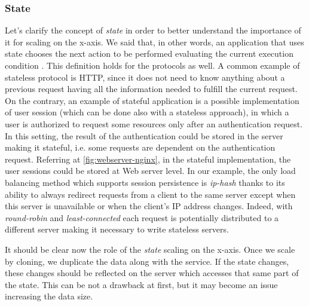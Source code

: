 \subsubsection{State}
Let's clarify the concept of \emph{state} in order to better understand the
importance of it for scaling on the x-axis. We said that, in other words, an
application that uses state chooses the next action to be performed evaluating
the current execution condition \cite{bib:art-of-scalability}. This definition
holds for the protocols as well. A common example of stateless protocol is HTTP,
since it does not need to know anything about a previous request having all the
information needed to fulfill the current request. On the contrary, an example
of stateful application is a possible implementation of user session (which can
be done also with a stateless approach), in which a user is authorized to
request some resources only after an authentication request. In this setting,
the result of the authentication could be stored in the server making it
stateful, i.e. some requests are dependent on the authentication request.
Referring at \autoref{fig:webserver-nginx}, in the stateful implementation, the
user sessions could be stored at Web server level. In our example, the only load
balancing method which supports session persistence is \emph{ip-hash} thanks to
its ability to always redirect requests from a client to the same server except
when this server is unavailable or when the client's IP address changes. Indeed,
with \emph{round-robin} and \emph{least-connected} each request is potentially
distributed to a different server making it necessary to write stateless
servers.

It should be clear now the role of the \emph{state} scaling on the x-axis. Once
we scale by cloning, we duplicate the data along with the service. If the state
changes, these changes should be reflected on the server which accesses that
same part of the state. This can be not a drawback at first, but it may become
an issue increasing the data size.

